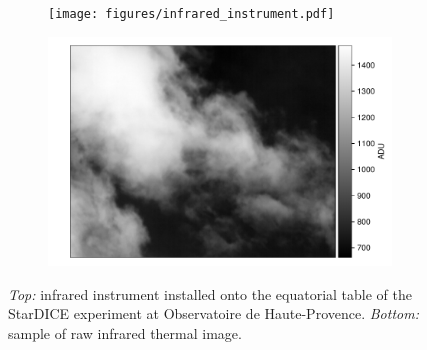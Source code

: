\documentclass[amt, article]{copernicus}
\begin{document}
\begin{figure}[t]
    \centering
    \begin{subfigure}[b]{0.9\hsize}
        \texttt{[image: figures/infrared\_instrument.pdf]}
    \end{subfigure}
    \hfill
    \begin{subfigure}[b]{\hsize}
        \includegraphics[width=\textwidth]{figures/sample_sky_image.pdf}
    \end{subfigure}
    \caption{\textit{Top:} infrared instrument installed onto the equatorial table of the StarDICE experiment at Observatoire de Haute-Provence. \textit{Bottom:} sample of raw infrared thermal image.}
    \label{fig:infrared_system}
\end{figure}



\end{document}
